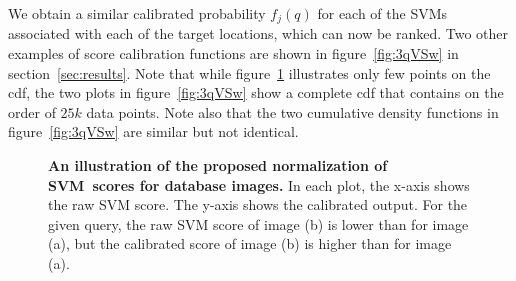       We obtain a similar calibrated probability $f_j(q)$ for each of the SVMs associated with each of the target locations, which can now be ranked.
      Two other examples of score calibration functions are shown in figure~\ref{fig:3qVSw} in section~\ref{sec:results}. 
Note that while figure~\ref{fig:calib} illustrates only few points on the cdf, the two plots in figure~\ref{fig:3qVSw} show a complete cdf that contains on the order of $25k$ data points. Note also that the two cumulative density functions in figure~\ref{fig:3qVSw} are similar but not identical.
      \begin{figure}[t]
         \vspace{1mm}
         \vspace{1.5mm}\newline
         \vspace*{-3mm}
         \caption[]{
            \textbf{An illustration of the proposed normalization of SVM~scores for 
             database images.}
            In each plot, the x-axis shows the raw SVM score. The y-axis shows the calibrated output. For the given query, the raw SVM score of image (b) is lower than for image (a), but the calibrated score of image (b) is higher than for image (a). 
         }
         \vspace*{-2mm}
         \label{fig:calib}
      \end{figure}

